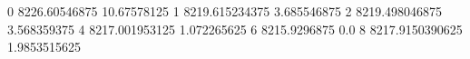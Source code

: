 0 8226.60546875 10.67578125
1 8219.615234375 3.685546875
2 8219.498046875 3.568359375
4 8217.001953125 1.072265625
6 8215.9296875 0.0
8 8217.9150390625 1.9853515625
